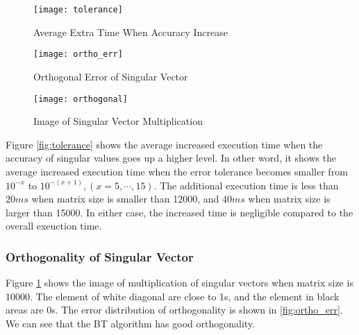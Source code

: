 \begin{figure}[hbpt]
\vspace{-0.3in}
\begin{minipage}[t]{0.33\linewidth}
\centering
\texttt{[image: tolerance]}
\vspace{-0.1in}
\caption{Average Extra Time When Accuracy Increase}
\label{fig:tolerance}
\end{minipage}%
\begin{minipage}[t]{0.33\linewidth}
\centering
\texttt{[image: ortho\_err]}
\vspace{-0.1in}
\caption{Orthogonal Error of Singular Vector}
\label{fig:ortho_err}
\end{minipage}
\begin{minipage}[t]{0.33\linewidth}
\centering
\texttt{[image: orthogonal]}
\vspace{-0.1in}
\caption{Image of Singular Vector Multiplication}
\label{fig:ortho_img}
\end{minipage}
\vspace{-0.2in}
\end{figure}
Figure \ref{fig:tolerance} shows the average increased execution time when the accuracy of singular values goes up a higher level.
In other word, it shows the average increased execution time when the error tolerance becomes smaller from $10^{-x}$ to $10^{-(x+1)}, (x=5,\cdots,15)$.
The additional execution time is less than $20 ms$ when matrix size is smaller than 12000, and $40 ms$ when matrix size is larger than 15000.
In either case, the increased time is negligible compared to the overall exeuction time.

\vspace{-0.1in}
\subsubsection{Orthogonality of Singular Vector}
\vspace{-0.1in}
Figure \ref{fig:ortho_img} shows the image of multiplication of singular vectors when matrix size is 10000.
The element of white diagonal are close to 1s, and the element in black areas are 0s.
The error distribution of orthogonality is shown in \ref{fig:ortho_err}. We can see that the BT algorithm has good orthogonality.
